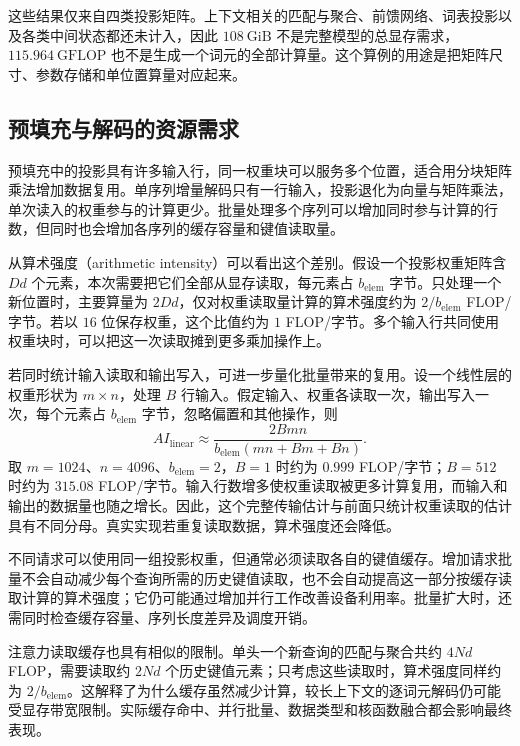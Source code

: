 这些结果仅来自四类投影矩阵。上下文相关的匹配与聚合、前馈网络、词表投影以及各类中间状态都还未计入，因此 $108\ \mathrm{GiB}$ 不是完整模型的总显存需求，$115.964\ \mathrm{GFLOP}$ 也不是生成一个词元的全部计算量。这个算例的用途是把矩阵尺寸、参数存储和单位置算量对应起来。

\subsection{预填充与解码的资源需求}

预填充中的投影具有许多输入行，同一权重块可以服务多个位置，适合用分块矩阵乘法增加数据复用。单序列增量解码只有一行输入，投影退化为向量与矩阵乘法，单次读入的权重参与的计算更少。批量处理多个序列可以增加同时参与计算的行数，但同时也会增加各序列的缓存容量和键值读取量。

从算术强度（arithmetic intensity）可以看出这个差别。假设一个投影权重矩阵含 $D d$ 个元素，本次需要把它们全部从显存读取，每元素占 $b_{\mathrm{elem}}$ 字节。只处理一个新位置时，主要算量为 $2Dd$，仅对权重读取量计算的算术强度约为 $2/b_{\mathrm{elem}}$ FLOP/字节。若以 $16$ 位保存权重，这个比值约为 $1$ FLOP/字节。多个输入行共同使用权重块时，可以把这一次读取摊到更多乘加操作上。

若同时统计输入读取和输出写入，可进一步量化批量带来的复用。设一个线性层的权重形状为 $m\times n$，处理 $B$ 行输入。假定输入、权重各读取一次，输出写入一次，每个元素占 $b_{\mathrm{elem}}$ 字节，忽略偏置和其他操作，则
\begin{equation}
 AI_{\mathrm{linear}}\approx
 \frac{2Bmn}{b_{\mathrm{elem}}(mn+Bm+Bn)}.
 \label{l12:eq:batch-ai}
\end{equation}
取 $m=1024$、$n=4096$、$b_{\mathrm{elem}}=2$，$B=1$ 时约为 $0.999$ FLOP/字节；$B=512$ 时约为 $315.08$ FLOP/字节。输入行数增多使权重读取被更多计算复用，而输入和输出的数据量也随之增长。因此，这个完整传输估计与前面只统计权重读取的估计具有不同分母。真实实现若重复读取数据，算术强度还会降低。

不同请求可以使用同一组投影权重，但通常必须读取各自的键值缓存。增加请求批量不会自动减少每个查询所需的历史键值读取，也不会自动提高这一部分按缓存读取计算的算术强度；它仍可能通过增加并行工作改善设备利用率。批量扩大时，还需同时检查缓存容量、序列长度差异及调度开销。

注意力读取缓存也具有相似的限制。单头一个新查询的匹配与聚合共约 $4Nd$ FLOP，需要读取约 $2Nd$ 个历史键值元素；只考虑这些读取时，算术强度同样约为 $2/b_{\mathrm{elem}}$。这解释了为什么缓存虽然减少计算，较长上下文的逐词元解码仍可能受显存带宽限制。实际缓存命中、并行批量、数据类型和核函数融合都会影响最终表现。

